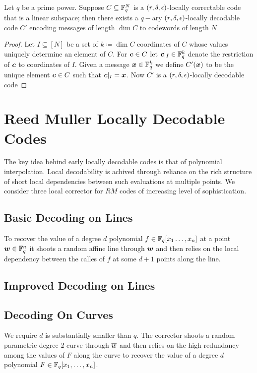 \begin{lemma}
	Let $q$ be a prime power. Suppose $C\subseteq \mathbb{F}_q^N$ is a $(r,\delta, \epsilon)$-locally correctable code that is a linear subspace; then there exists a $q-$ary $(r,\delta,\epsilon)$-locally decodable code $C'$ encoding messages of length $\dim C$ to codewords of length $N$
\end{lemma}
\begin{proof}
	Let $I\subseteq [N]$ be a set of $k\coloneqq \dim C$ coordinates of $C$ whose values uniquely determine an element of $C$. For $\boldsymbol{c}\in C$ let $\boldsymbol{c}|_I\in \mathbb{F}_q^k$ denote the restriction of $\boldsymbol{c}$ to coordinates of $I$. Given a message $\boldsymbol{x}\in \mathbb{F}_q^k$ we define $C'(\boldsymbol{x})$ to be the unique element $\boldsymbol{c}\in C$ such that $\boldsymbol{c}|_I=\boldsymbol{x}$. Now $C'$ is a $(r,\delta,\epsilon)$-locally decodable code
\end{proof}

\section{Reed Muller Locally Decodable Codes}
The key idea behind early locally decodable codes is that of polynomial interpolation. Local decodability is achived through reliance on the rich structure of short local dependencies between such evaluations at multiple points. We consider three local corrector for $RM$ codes of increasing level of sophistication. 
\subsection{Basic Decoding on Lines}
To recover the value of a degree $d$ polynomial $f\in \mathbb{F}_q[x_1\dots, x_n]$ at a point $\boldsymbol{w}\in \mathbb{F}_q^n$ it shoots a random affine line through $\boldsymbol{w}$ and then relies on the local dependency between the calles of $f$ at some $d+1$ points along the line.
\subsection{Improved Decoding on Lines}
\subsection{Decoding On Curves}
We require $d$ is substantially smaller than $q$. The corrector shoots a random parametric degree 2 curve through $\overline{w}$ and then relies on the high redundancy among the values of $F$ along the curve to recover the value of a degree $d$ polynomial $F\in \mathbb{F}_q[x_1,\dots,x_n]$.

